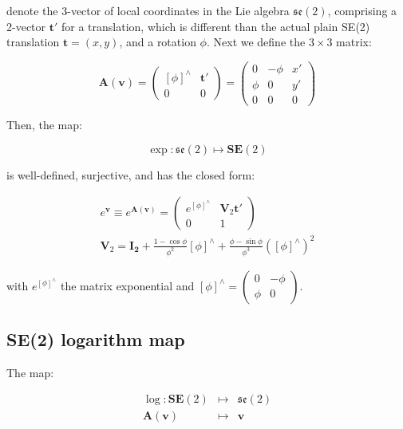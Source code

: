 \documentclass[a4paper,11pt]{report}
\newcommand{\hatop}[1]{#1^\wedge}
\begin{document}
\noindent denote the 3-vector of local coordinates in the Lie algebra $\mathfrak{se}(2)$,
comprising a 2-vector $\mathbf{t}'$ for a translation, 
which is different than the actual plain SE(2) translation $\mathbf{t}=(x,y)$,
and a rotation $\phi$.
Next we define the $3 \times 3$ matrix:

\begin{equation}
 \mathbf{A}(\mathbf{v})=
\left(
\begin{array}{c|c}
 \hatop{[\phi]}  & \mathbf{t}' \\
 \hline
  0 & 0
\end{array}
\right)
=
\left(
\begin{array}{cc|c}
 0 & -\phi & x' \\
 \phi & 0 & y' \\
 \hline
 0 & 0 & 0
\end{array}
\right)
\end{equation}

Then, the map:

\begin{equation}
  \exp: \mathfrak{se}(2) \mapsto \mathbf{SE}(2)
\end{equation}

\noindent is well-defined, surjective, and has the closed form:

\begin{eqnarray}
  e^ { \mathbf{v} } \equiv  e^ { \mathbf{A}(\mathbf{v}) } =
\left(
\begin{array}{cc}
  e^{\hatop{[\phi]}} & \mathbf{V}_2 \mathbf{t}' \\
   0 & 1
\end{array}
\right)
\\
\label{eq:se2:V}
\mathbf{V}_2 = \mathbf{I_2}
+ \frac{1-\cos \phi}{\phi^2} \hatop{[\phi]}
+ \frac{\phi- \sin \phi}{\phi^3} (\hatop{[\phi]})^2 
\end{eqnarray}

\noindent with $e^{\hatop{[\phi]}}$ the matrix exponential 
and $\hatop{[\phi]}=\left( \begin{array}{cc} 0 & -\phi \\ \phi & 0\end{array}\right)$.

\subsection{SE(2) logarithm map}
\label{sect:se2.log}

The map:

\begin{eqnarray}
  \log: \mathbf{SE}(2) &\mapsto& \mathfrak{se}(2) \\
  \mathbf{A}(\mathbf{v})  & \mapsto & \mathbf{v}
\nonumber
\end{eqnarray}
\end{document}
